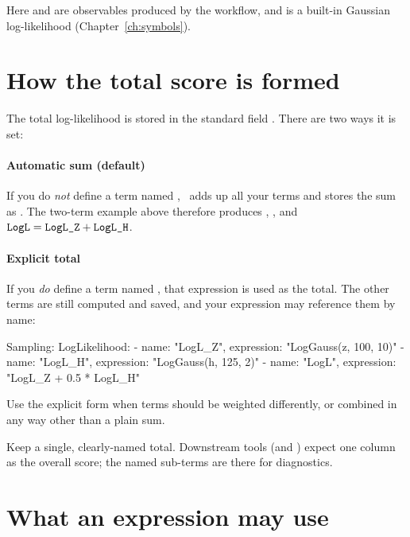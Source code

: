 \noindent Here  and  are observables produced by the workflow, and
 is a built-in Gaussian log-likelihood
(Chapter~\ref{ch:symbols}).

\section{How the total score is formed}
\label{sec:logl-total}

The total log-likelihood is stored in the standard field . There are two ways it is
set:

\paragraph{Automatic sum (default)} If you do \emph{not} define a term named ,
\Jarvis\ adds up all your terms and stores the sum as . The two-term example above
therefore produces , , and
$\yamlkey{LogL} = \yamlkey{LogL\_Z} + \yamlkey{LogL\_H}$.

\paragraph{Explicit total} If you \emph{do} define a term named , that expression
is used as the total. The other terms are still computed and saved, and your 
expression may reference them by name:

\begin{yamlwin}
Sampling:
  LogLikelihood:
    - {name: "LogL_Z", expression: "LogGauss(z, 100, 10)"}
    - {name: "LogL_H", expression: "LogGauss(h, 125, 2)"}
    - {name: "LogL",   expression: "LogL_Z + 0.5 * LogL_H"}
\end{yamlwin}

\noindent Use the explicit form when terms should be weighted differently, or combined in any way
other than a plain sum.

\begin{jtip}
Keep a single, clearly-named total. Downstream tools (and \JPlot) expect one 
column as the overall score; the named sub-terms are there for diagnostics.
\end{jtip}

\section{What an expression may use}
\label{sec:logl-inputs}

